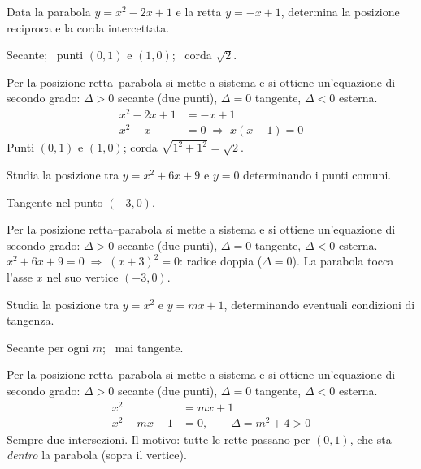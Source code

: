 \begin{question}[ID=2.2, subtitle={Posizione di $y=x^2-2x+1$ e $y=-x+1$ con corda}, difficulty=facile, tags={parabola, retta, corda}]
Data la parabola $y=x^2-2x+1$ e la retta $y=-x+1$, determina la posizione reciproca e la corda intercettata.
\begin{solution}
Secante; \ punti $(0,1)$ e $(1,0)$; \ corda $\sqrt2$.
\end{solution}
\begin{explanation}
Per la posizione retta–parabola si mette a sistema e si ottiene un'equazione di secondo grado: $\Delta>0$ secante (due punti), $\Delta=0$ tangente, $\Delta<0$ esterna.
\[\begin{aligned}
x^2-2x+1 &= -x+1\\
x^2-x &= 0 \;\Rightarrow\; x(x-1)=0
\end{aligned}\]
Punti $(0,1)$ e $(1,0)$; corda $\sqrt{1^2+1^2}=\sqrt2$.
\end{explanation}
\end{question}


\begin{question}[ID=2.3, subtitle={Tangenza tra $y=x^2+6x+9$ e l'asse $x$}, difficulty=media, tags={parabola, tangenza}]
Studia la posizione tra $y=x^2+6x+9$ e $y=0$ determinando i punti comuni.
\begin{solution}
Tangente nel punto $(-3,0)$.
\end{solution}
\begin{explanation}
Per la posizione retta–parabola si mette a sistema e si ottiene un'equazione di secondo grado: $\Delta>0$ secante (due punti), $\Delta=0$ tangente, $\Delta<0$ esterna.
$x^2+6x+9=0 \;\Rightarrow\; (x+3)^2=0$: radice doppia ($\Delta=0$). La parabola tocca l'asse $x$ nel suo vertice $(-3,0)$.
\end{explanation}
\end{question}


\begin{question}[ID=2.4, subtitle={Posizione di $y=x^2$ e $y=mx+1$ al variare di $m$}, difficulty=media, tags={parabola, retta, parametrico}]
Studia la posizione tra $y=x^2$ e $y=mx+1$, determinando eventuali condizioni di tangenza.
\begin{solution}
Secante per ogni $m$; \ mai tangente.
\end{solution}
\begin{explanation}
Per la posizione retta–parabola si mette a sistema e si ottiene un'equazione di secondo grado: $\Delta>0$ secante (due punti), $\Delta=0$ tangente, $\Delta<0$ esterna.
\[\begin{aligned}
x^2 &= mx+1\\
x^2-mx-1 &= 0, \qquad \Delta=m^2+4>0
\end{aligned}\]
Sempre due intersezioni. Il motivo: tutte le rette passano per $(0,1)$, che sta \emph{dentro} la parabola (sopra il vertice).
\end{explanation}
\end{question}

